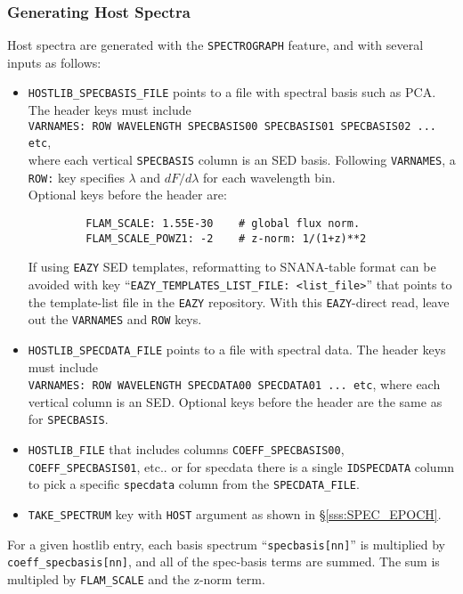 \documentclass[12pt]{article}
\newcommand{\Flam}{dF/d\lambda}
\begin{document}
{%
\newcommand{\Rhalf}{R_{1/2}}
\newcommand{\Sn}{{\cal S}_{n}}


\clearpage
\subsubsection{Generating Host Spectra}
\label{sss:hostlib_spectra}

Host spectra are generated with the {\tt SPECTROGRAPH} feature,
and with several inputs as follows:
\begin{itemize}[noitemsep]
  \item {\tt HOSTLIB\_SPECBASIS\_FILE} points to a file with spectral basis
         such as PCA. The header keys must include \\
         {\tt VARNAMES: ROW  WAVELENGTH  SPECBASIS00 SPECBASIS01 SPECBASIS02 ... etc}, \\
         where each vertical {\tt SPECBASIS} column is an SED basis. Following {\tt VARNAMES},
         a {\tt ROW:} key specifies $\lambda$ and $\Flam$ for each wavelength bin. \\
         Optional keys before the header are:
          \vspace{-0.5cm}
     \begin{verbatim}
         FLAM_SCALE: 1.55E-30    # global flux norm.
         FLAM_SCALE_POWZ1: -2    # z-norm: 1/(1+z)**2
     \end{verbatim}  \vspace{-1.0cm}
    If using {\tt EAZY} SED templates, reformatting to SNANA-table format can be avoided with
    key ``{\tt EAZY\_TEMPLATES\_LIST\_FILE: <list\_file>}'' that points to the template-list file
    in the {\tt EAZY} repository. With this {\tt EAZY}-direct read, 
    leave out the {\tt VARNAMES} and {\tt ROW} keys.
%
  \item {\tt HOSTLIB\_SPECDATA\_FILE} points to a file with spectral data.
         The header keys must include \\
         {\tt VARNAMES: ROW  WAVELENGTH  SPECDATA00 SPECDATA01 ... etc}, 
         where each vertical column is an SED.
         Optional keys before the header are the same as for {\tt SPECBASIS}.
%
  \item {\tt HOSTLIB\_FILE} that includes columns 
          {\tt COEFF\_SPECBASIS00}, {\tt COEFF\_SPECBASIS01}, etc..
          or for specdata there is a single {\tt IDSPECDATA} column
          to pick a specific {\tt specdata} column from the
          {\tt SPECDATA\_FILE}.
  \item {\tt TAKE\_SPECTRUM} key with {\tt HOST} argument as shown in 
           \S\ref{sss:SPEC_EPOCH}.
\end{itemize}
%
For a given hostlib entry, each basis spectrum ``{\tt specbasis[nn]}''
is multiplied by {\tt coeff\_specbasis[nn]}, and all of the spec-basis
terms are summed. The sum is multipled by {\tt FLAM\_SCALE} and
the z-norm term. 


}
\end{document}
